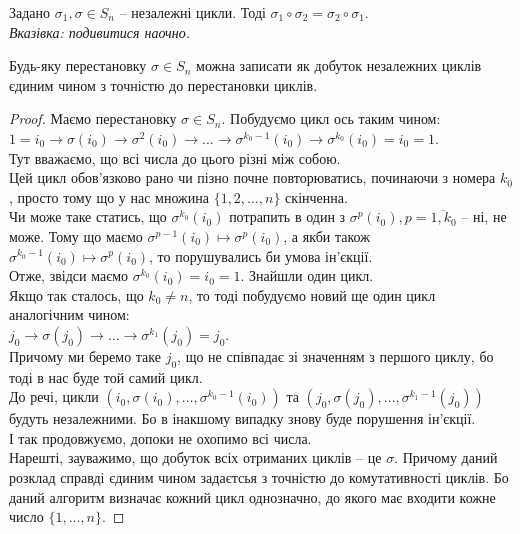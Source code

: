 \documentclass{math_library}
\begin{document}
\begin{lemma}
Задано $\sigma_1, \sigma \in S_n$ -- незалежні цикли. Тоді $\sigma_1 \circ \sigma_2 = \sigma_2 \circ \sigma_1$.\\
\textit{Вказівка: подивитися наочно.}
\end{lemma}

\begin{theorem}
Будь-яку перестановку $\sigma \in S_n$ можна записати як добуток незалежних циклів єдиним чином з точністю до перестановки циклів.
\end{theorem}

\begin{proof}
Маємо перестановку $\sigma \in S_n$. Побудуємо цикл ось таким чином:\\
$1 = i_0 \to \sigma(i_0) \to \sigma^2(i_0) \to \dots \to \sigma^{k_0-1}(i_0) \to \sigma^{k_0}(i_0) = i_0 = 1$.\\
Тут вважаємо, що всі числа до цього різні між собою.\\
Цей цикл обов'язково рано чи пізно почне повторюватись, починаючи з номера $k_0$, просто тому що у нас множина $\{1,2,\dots,n\}$ скінченна.\\
Чи може таке статись, що $\sigma^{k_0}(i_0)$ потрапить в один з $\sigma^{p}(i_0), p = \overline{1,k_0}$ -- ні, не може. Тому що маємо $\sigma^{p-1}(i_0) \mapsto \sigma^p(i_0)$, а якби також $\sigma^{k_0-1}(i_0) \mapsto \sigma^p(i_0)$, то порушувались би умова ін'єкції.\\
Отже, звідси маємо $\sigma^{k_0}(i_0) = i_0 = 1$. Знайшли один цикл.\\
Якщо так сталось, що $k_0 \neq n$, то тоді побудуємо новий ще один цикл аналогічним чином:\\
$j_0 \to \sigma(j_0) \to \dots \to \sigma^{k_1}(j_0) = j_0$.\\
Причому ми беремо таке $j_0$, що не співпадає зі значенням з першого циклу, бо тоді в нас буде той самий цикл.\\
До речі, цикли $(i_0,\sigma(i_0), \dots, \sigma^{k_0-1}(i_0))$ та $(j_0,\sigma(j_0), \dots, \sigma^{k_1-1}(j_0))$ будуть незалежними. Бо в інакшому випадку знову буде порушення ін'єкції.\\
І так продовжуємо, допоки не охопимо всі числа.\\
Нарешті, зауважимо, що добуток всіх отриманих циклів -- це $\sigma$. Причому даний розклад справді єдиним чином задаєтсья з точністю до комутативності циклів. Бо даний алгоритм визначає кожний цикл однозначно, до якого має входити кожне число $\{1,\dots,n\}$.
\end{proof}
\end{document}
